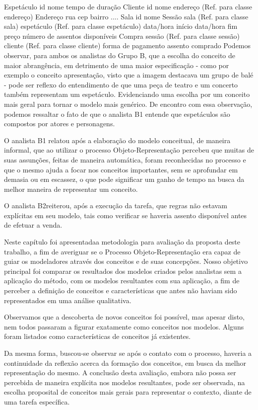 Espetáculo
id
nome
tempo de duração
Cliente
id
nome
endereço (Ref. para classe endereço)
Endereço
rua
cep
bairro
....
Sala
id
nome
Sessão
sala (Ref. para classe sala)
espetáculo (Ref. para classe espetáculo)
data/hora início
data/hora fim
preço
número de assentos disponíveis
Compra
sessão (Ref. para classe sessão)
cliente (Ref. para classe cliente)
forma de pagamento
assento comprado
Podemos observar, para ambos os analistas do Grupo B, que a escolha do conceito de maior abrangência, em detrimento de uma maior especificação - como por exemplo o conceito apresentação, visto que a imagem destacava um grupo de balé - pode ser reflexo do entendimento de que uma peça de teatro e um concerto também representam um espetáculo. Evidenciando uma escolha por um conceito mais geral para tornar o modelo mais genérico. De encontro com essa observação, podemos ressaltar o fato de que o analista B1 entende que espetáculos são compostos por atores e personagens.

O analista B1 relatou após a elaboração do modelo conceitual, de maneira informal, que ao utilizar o processo Objeto-Representação percebeu que muitas de suas assunções, feitas de maneira automática, foram reconhecidas no processo e que o mesmo ajuda a focar nos conceitos importantes, sem se aprofundar em demasia ou em escassez, o que pode significar um ganho de tempo na busca da melhor maneira de representar um conceito.

O analista B2reiterou, após a execução da tarefa, que regras não estavam explícitas em seu modelo, tais como verificar se haveria assento disponível antes de efetuar a venda.



Neste capítulo foi apresentadaa metodologia para avaliação da proposta deste trabalho, a fim de averiguar se o Processo Objeto-Representação era capaz de guiar os modeladores através dos conceitos e de suas concepções. Nosso objetivo principal foi comparar os resultados dos modelos criados pelos analistas sem a aplicação do método, com os modelos resultantes com sua aplicação, a fim de perceber a definição de conceitos e características que antes não haviam sido representados em uma análise qualitativa.

Observamos que a descoberta de novos conceitos foi possível, mas apesar disto, nem todos passaram a figurar exatamente como conceitos nos modelos. Alguns foram listados como características de conceitos já existentes.

Da mesma forma, buscou-se observar se após o contato com o processo, haveria a continuidade da reflexão acerca da formação dos conceitos, em busca da melhor representação do mesmo. A conclusão desta avaliação, embora não possa ser percebida de maneira explícita nos modelos resultantes, pode ser observada, na escolha proposital de conceitos mais gerais para representar o contexto, diante de uma tarefa específica.

